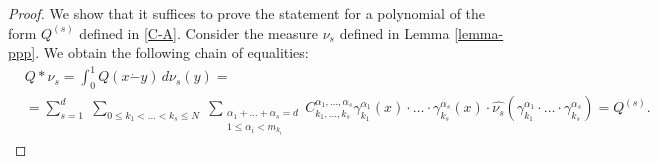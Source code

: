 \documentclass[12pt]{article}
\begin{document}
	\begin{proof}
		We show that it suffices to prove the statement for a polynomial of the form $Q^{(s)}$ defined in \eqref{C-A}. Consider the measure $\nu_s$ defined in Lemma \ref{lemma-ppp}. We obtain the following chain of equalities:
		\begin{equation*}
			\begin{split}
				& Q * \nu_s = \int_0^1 Q(x \dot- y) \, d\nu_s(y) = \\
				&= \sum_{s=1}^{d} \; \sum_{0\le k_1 < \ldots < k_s \le N} \; \sum_{\substack{\alpha_1+\ldots+\alpha_s = d \\ 1 \le \alpha_i < m_{k_i}}} C_{k_1, \ldots, k_s}^{\alpha_1, \ldots, \alpha_s} \gamma_{k_1}^{\alpha_1}(x) \cdot \ldots \cdot \gamma_{k_s}^{\alpha_s}(x)\cdot \widehat{\nu_s}(\gamma_{k_1}^{\alpha_1} \cdot \ldots \cdot \gamma_{k_s}^{\alpha_s}) = Q^{(s)}.
			\end{split}
		\end{equation*}
		

\end{proof}
\end{document}
